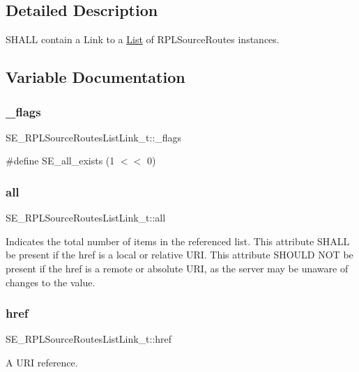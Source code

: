 \subsection{Detailed Description}
S\+H\+A\+LL contain a Link to a \hyperlink{structList}{List} of R\+P\+L\+Source\+Routes instances. 

\subsection{Variable Documentation}
\mbox{\label{group__RPLSourceRoutesListLink_gacc50a570981ab981f8533f4d7d12163e}} 
\subsubsection{\texorpdfstring{\+\_\+flags}{\_flags}}
{\footnotesize\ttfamily S\+E\+\_\+\+R\+P\+L\+Source\+Routes\+List\+Link\+\_\+t\+::\+\_\+flags}

\#define S\+E\+\_\+all\+\_\+exists (1 $<$$<$ 0) \mbox{\label{group__RPLSourceRoutesListLink_ga13f0e416ff1e772889d728cec3e02672}} 
\subsubsection{\texorpdfstring{all}{all}}
{\footnotesize\ttfamily S\+E\+\_\+\+R\+P\+L\+Source\+Routes\+List\+Link\+\_\+t\+::all}

Indicates the total number of items in the referenced list. This attribute S\+H\+A\+LL be present if the href is a local or relative U\+RI. This attribute S\+H\+O\+U\+LD N\+OT be present if the href is a remote or absolute U\+RI, as the server may be unaware of changes to the value. \mbox{\label{group__RPLSourceRoutesListLink_ga2118dad3467a725136fbaab7690c77a8}} 
\subsubsection{\texorpdfstring{href}{href}}
{\footnotesize\ttfamily S\+E\+\_\+\+R\+P\+L\+Source\+Routes\+List\+Link\+\_\+t\+::href}

A U\+RI reference. 